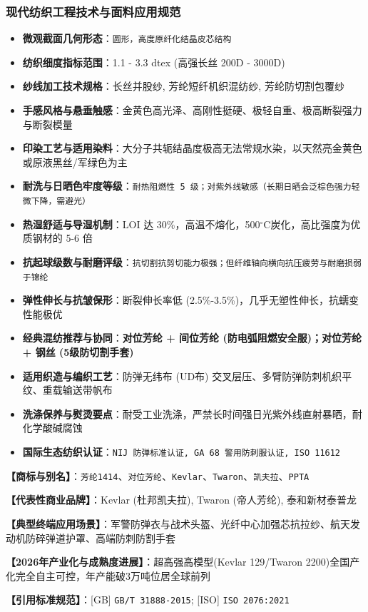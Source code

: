 \documentclass[11pt,openright,twoside,UTF8]{ctexbook}
\begin{document}
\subsubsection*{现代纺织工程技术与面料应用规范}
\begin{itemize} \setlength{\itemsep}{2pt}
    \item \textbf{微观截面几何形态}：\texttt{圆形，高度原纤化结晶皮芯结构}
    \item \textbf{纺织细度指标范围}：1.1 - 3.3 dtex (高强长丝 200D - 3000D)
    \item \textbf{纱线加工技术规格}：长丝并股纱, 芳纶短纤机织混纺纱, 芳纶防切割包覆纱
    \item \textbf{手感风格与悬垂触感}：金黄色高光泽、高刚性挺硬、极轻自重、极高断裂强力与断裂模量
    \item \textbf{印染工艺与适用染料}：大分子共轭结晶度极高无法常规水染，以天然亮金黄色或原液黑丝/军绿色为主
    \item \textbf{耐洗与日晒色牢度等级}：\texttt{耐热阻燃性 5 级；对紫外线敏感（长期日晒会泛棕色强力轻微下降，需避光）}
    \item \textbf{热湿舒适与导湿机制}：LOI 达 30\%，高温不熔化，500$^\circ\mathrm{C}$炭化，高比强度为优质钢材的 5-6 倍
    \item \textbf{抗起球级数与耐磨评级}：\texttt{抗切割抗剪切能力极强；但纤维轴向横向抗压疲劳与耐磨损弱于锦纶}
    \item \textbf{弹性伸长与抗皱保形}：断裂伸长率低 (2.5\%-3.5\%)，几乎无塑性伸长，抗蠕变性能极优
    \item \textbf{经典混纺推荐与协同}：\textbf{对位芳纶 + 间位芳纶 (防电弧阻燃安全服)；对位芳纶 + 钢丝 (5级防切割手套)}
    \item \textbf{适用织造与编织工艺}：防弹无纬布 (UD布) 交叉层压、多臂防弹防刺机织平纹、重载输送带帆布
    \item \textbf{洗涤保养与熨烫要点}：耐受工业洗涤，严禁长时间强日光紫外线直射暴晒，耐化学酸碱腐蚀
    \item \textbf{国际生态纺织认证}：\texttt{NIJ 防弹标准认证, GA 68 警用防刺服认证, ISO 11612}
\end{itemize}
\vspace{0.2cm}

\noindent\textbf{【商标与别名】}：\texttt{芳纶1414}、\texttt{对位芳纶}、\texttt{Kevlar}、\texttt{Twaron}、\texttt{凯夫拉}、\texttt{PPTA}\par
\noindent\textbf{【代表性商业品牌】}：Kevlar (杜邦凯夫拉), Twaron (帝人芳纶), 泰和新材泰普龙\par
\noindent\textbf{【典型终端应用场景】}：军警防弹衣与战术头盔、光纤中心加强芯抗拉纱、航天发动机防碎弹道护罩、高端防刺防割手套\par
\noindent\textbf{【2026年产业化与成熟度进展】}：超高强高模型(Kevlar 129/Twaron 2200)全国产化完全自主可控，年产能破3万吨位居全球前列\par
\noindent\textbf{【引用标准规范】}：[GB] \texttt{GB/T 31888-2015}; [ISO] \texttt{ISO 2076:2021}\par
\vspace{0.5cm}
\end{document}
